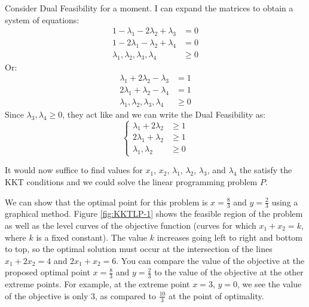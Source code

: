 Consider Dual Feasibility for a moment. I can expand the matrices to obtain a system of equations:
\begin{displaymath}
\begin{aligned}
1 - \lambda_1 - 2\lambda_2 + \lambda_3 & = 0\\
1 - 2\lambda_1 - \lambda_2 + \lambda_4 & = 0\\
\lambda_1,\lambda_2,\lambda_3,\lambda_4 & \geq 0
\end{aligned}
\end{displaymath}
Or:
\begin{displaymath}
\begin{aligned}
\lambda_1 + 2\lambda_2 - \lambda_3 &= 1\\
2\lambda_1 + \lambda_2 - \lambda_4 &= 1\\
\lambda_1,\lambda_2,\lambda_3,\lambda_4 & \geq 0
\end{aligned}
\end{displaymath}
Since $\lambda_3, \lambda_4 \geq 0$, they act like  and we can write the Dual Feasibility as:
\begin{equation}
\left\{
\begin{aligned}
\lambda_1 + 2\lambda_2 &\geq  1\\
2\lambda_1 + \lambda_2 &\geq 1\\
\lambda_1,\lambda_2& \geq 0
\end{aligned}\right.
\label{eqn:Lambda}
\end{equation}
\begin{remark} It would now suffice to find values for $x_1$, $x_2$, $\lambda_1$, $\lambda_2$, $\lambda_3$, and $\lambda_4$ the satisfy the KKT conditions and we could solve the linear programming problem $P$.
\end{remark}

We can show that the optimal point for this problem is $x = \tfrac{8}{3}$ and $y = \tfrac{2}{3}$ using a graphical method. Figure \ref{fig:KKTLP-1} shows the feasible region of the problem as well as the level curves of the objective function (curves for which $x_1 + x_2 = k$, where $k$ is a fixed constant). The value $k$ increases going left to right and bottom to top, so the optimal solution must occur at the intersection of the lines $x_1 + 2 x_2 = 4$ and $2x_1 + x_2 = 6$. You can compare the value of the objective at the proposed optimal point $x = \tfrac{8}{3}$ and $y = \tfrac{2}{3}$ to the value of the objective at the other extreme points. For example, at the extreme point $x = 3$, $y = 0$, we see the value of the objective is only $3$, as compared to $\tfrac{10}{3}$ at the point of optimality.


